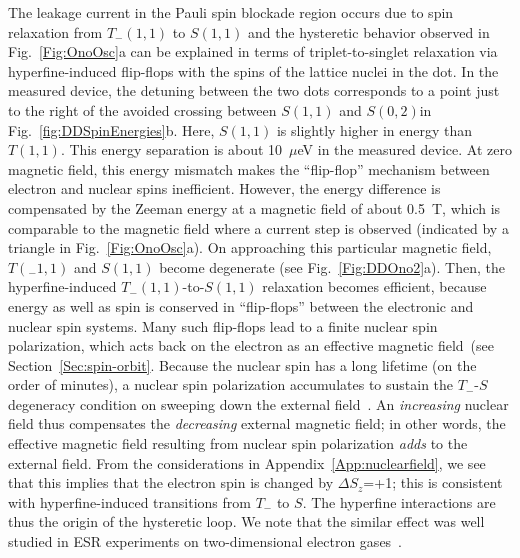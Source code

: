 \documentclass[rmp,twocolumn,aps]{revtex4}
\begin{document}
The leakage current in the Pauli spin blockade region occurs due
to spin relaxation from $T_-(1,1)$ to $S(1,1)$ and the hysteretic
behavior observed in Fig.~\ref{Fig:OnoOsc}a can be explained in
terms of triplet-to-singlet relaxation via hyperfine-induced flip-flops with the spins of the lattice nuclei in the dot.
In the measured device, the detuning between the two dots corresponds to a point just to the right of the avoided crossing between $S(1,1)$ and $S(0,2)$in Fig.~\ref{fig:DDSpinEnergies}b. Here, $S(1,1)$ is slightly higher in energy than $T(1,1)$. This energy separation is about 10~$\mu$eV in the measured device. At zero magnetic field, this energy mismatch makes the ``flip-flop'' mechanism between electron and nuclear spins inefficient. However, the energy difference is compensated by the Zeeman energy at a magnetic field
of about 0.5~T, which is comparable to the magnetic field
where a current step is observed (indicated by a triangle in
Fig.~\ref{Fig:OnoOsc}a). On approaching this particular magnetic
field, $T(_-1,1)$ and $S(1,1)$ become degenerate (see
Fig.~\ref{Fig:DDOno2}a). Then, the hyperfine-induced $T_-(1,1)$-to-$S(1,1)$ relaxation becomes efficient, because energy as well as spin is
conserved in ``flip-flops'' between the electronic and nuclear spin systems. Many such flip-flops lead to a finite
nuclear spin polarization, which acts back on the electron as an effective magnetic field~(see Section~\ref{Sec:spin-orbit}. Because
the nuclear spin has a long lifetime (on the order of minutes), a
nuclear spin polarization accumulates to sustain the $T_-$-$S$
degeneracy condition on sweeping down the external
field~\cite{OnoPRL2004}. An \textit{increasing} nuclear field thus compensates the \textit{decreasing} external magnetic field; in other words, the effective
magnetic field resulting from nuclear spin polarization
\textit{adds} to the external field. From the considerations in
Appendix~\ref{App:nuclearfield}, we see that this implies that the electron spin is
changed by $\Delta S_z$=+1; this is consistent with
hyperfine-induced transitions from $T_-$ to $S$. The hyperfine
interactions are thus the origin of the hysteretic loop. We note
that the similar effect was well studied in ESR experiments on
two-dimensional electron gases~\cite{dobers88,Teraoka04}.
\end{document}
